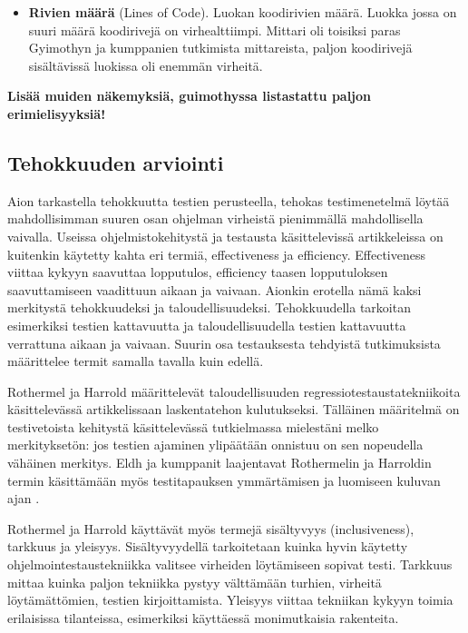 \documentclass[finnish]{tktltiki2}
\theoremstyle{definition}
\theoremstyle{remark}
\begin{document}
\begin{itemize}
  \item \textbf{Rivien määrä} (Lines of Code). Luokan koodirivien määrä.  Luokka jossa on suuri määrä koodirivejä on virhealttiimpi. Mittari oli toisiksi paras Gyimothyn ja kumppanien tutkimista mittareista, paljon koodirivejä sisältävissä luokissa oli enemmän virheitä. \cite{Gyimothy05}


\end{itemize}

\textbf{Lisää muiden näkemyksiä, guimothyssa listastattu paljon erimielisyyksiä! \cite{Gyimothy05}}







\subsection{Tehokkuuden arviointi}

Aion tarkastella tehokkuutta testien perusteella, tehokas testimenetelmä löytää mahdollisimman suuren osan ohjelman virheistä pienimmällä mahdollisella vaivalla. Useissa ohjelmistokehitystä ja testausta käsittelevissä artikkeleissa on kuitenkin käytetty kahta eri termiä, effectiveness ja efficiency.  Effectiveness viittaa kykyyn saavuttaa lopputulos, efficiency taasen lopputuloksen saavuttamiseen vaadittuun aikaan ja vaivaan. Aionkin erotella nämä kaksi merkitystä tehokkuudeksi ja taloudellisuudeksi. Tehokkuudella tarkoitan esimerkiksi testien kattavuutta ja taloudellisuudella testien kattavuutta verrattuna aikaan ja vaivaan. Suurin osa testauksesta tehdyistä tutkimuksista määrittelee termit samalla tavalla kuin edellä. \cite{Juristo06}

Rothermel ja Harrold määrittelevät taloudellisuuden regressiotestaustatekniikoita käsittelevässä artikkelissaan \cite{Rothermel96} laskentatehon kulutukseksi. Tälläinen määritelmä on testivetoista kehitystä käsittelevässä tutkielmassa mielestäni melko merkityksetön: jos testien ajaminen ylipäätään onnistuu on sen nopeudella vähäinen merkitys. Eldh ja kumppanit laajentavat Rothermelin ja Harroldin termin käsittämään myös testitapauksen ymmärtämisen ja luomiseen kuluvan ajan \cite{Eldh06}.

Rothermel ja Harrold käyttävät myös termejä sisältyvyys (inclusiveness), tarkkuus ja yleisyys. Sisältyvyydellä  tarkoitetaan kuinka hyvin käytetty ohjelmointestaustekniikka valitsee virheiden löytämiseen sopivat testi. Tarkkuus mittaa kuinka paljon tekniikka pystyy välttämään turhien, virheitä löytämättömien, testien kirjoittamista. Yleisyys viittaa tekniikan kykyyn toimia erilaisissa tilanteissa, esimerkiksi käyttäessä monimutkaisia rakenteita.\cite{Rothermel96}
\end{document}
